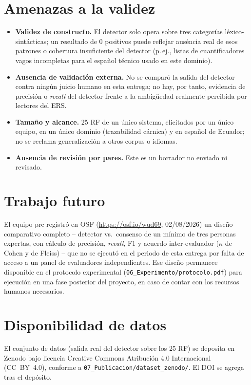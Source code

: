 \documentclass[11pt,a4paper]{article}
\newcommand{\br}{\discretionary{}{}{}}
\begin{document}
\section{Amenazas a la validez}
\begin{itemize}[leftmargin=*]
\item \textbf{Validez de constructo.} El detector solo opera sobre tres categor\'ias l\'exico-sint\'acticas; un resultado de 0 positivos puede reflejar aus\'encia real de esos patrones o cobertura insuficiente del detector (p.\,ej., listas de cuantificadores vagos incompletas para el espa\~nol t\'ecnico usado en este dominio).
\item \textbf{Ausencia de validaci\'on externa.} No se compar\'o la salida del detector contra ning\'un juicio humano en esta entrega; no hay, por tanto, evidencia de precisi\'on o \emph{recall} del detector frente a la ambig\"uedad realmente percibida por lectores del ERS.
\item \textbf{Tama\~no y alcance.} 25 RF de un \'unico sistema, elicitados por un \'unico equipo, en un \'unico dominio (trazabilidad c\'arnica) y en espa\~nol de Ecuador; no se reclama generalizaci\'on a otros corpus o idiomas.
\item \textbf{Ausencia de revisi\'on por pares.} Este es un borrador no enviado ni revisado.
\end{itemize}

\section{Trabajo futuro}

El equipo pre-registr\'o en OSF (\url{https://osf.io/wud69}, 02/08/2026) un dise\~no comparativo completo -- detector vs.\ consenso de un m\'inimo de tres personas expertas, con c\'alculo de precisi\'on, \emph{recall}, F1 y acuerdo inter-evaluador ($\kappa$ de Cohen y de Fleiss) -- que no se ejecut\'o en el periodo de esta entrega por falta de acceso a un panel de evaluadores independientes. Ese dise\~no permanece disponible en el protocolo experimental (\texttt{06\_\br Experimento/\br protocolo.pdf}) para ejecuci\'on en una fase posterior del proyecto, en caso de contar con los recursos humanos necesarios.

\section*{Disponibilidad de datos}
El conjunto de datos (salida real del detector sobre los 25 RF) se deposita en Zenodo bajo licencia Creative Commons Atribuci\'on 4.0 Internacional (CC~BY~4.0), conforme a \texttt{07\_\br Publicacion/\br dataset\_\br zenodo/}. El DOI se agrega tras el dep\'osito.
\end{document}
